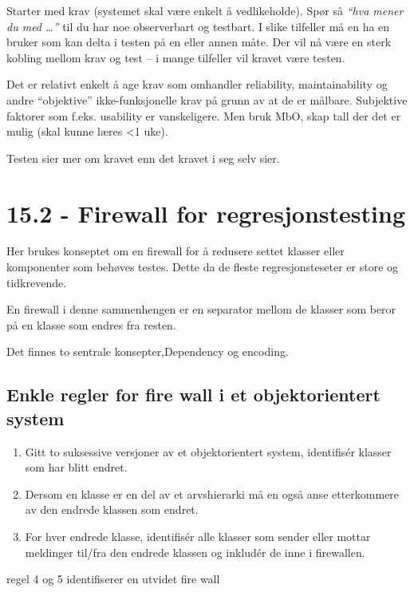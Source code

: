Starter med krav (systemet skal være enkelt å vedlikeholde). Spør så
\emph{``hva mener du med \ldots{}''} til du har noe observerbart og
testbart. I slike tilfeller må en ha en bruker som kan delta i testen på
en eller annen måte. Der vil nå være en sterk kobling mellom krav og
test -- i mange tilfeller vil kravet være testen.

Det er relativt enkelt å age krav som omhandler reliability,
maintainability og andre ``objektive'' ikke-funksjonelle krav på grunn
av at de er målbare. Subjektive faktorer som f.eks. usability er
vanskeligere. Men bruk MbO, skap tall der det er mulig (skal kunne læres
\textless{}1 uke).

Testen sier mer om kravet enn det kravet i seg selv sier.

\section{15.2 - Firewall for regresjonstesting}

Her brukes konseptet om en firewall for å redusere settet klasser eller
komponenter som behøves testes. Dette da de fleste regresjonsteseter er
store og tidkrevende.

En firewall i denne sammenhengen er en separator mellom de klasser som
beror på en klasse som endres fra resten.

Det finnes to sentrale konsepter,Dependency og encoding.

\subsection{Enkle regler for fire wall i et objektorientert system}

\begin{enumerate}[1.]
\item
  Gitt to suksessive versjoner av et objektorientert system, identifisér
  klasser som har blitt endret.
\item
  Dersom en klasse er en del av et arvshierarki må en også anse
  etterkommere av den endrede klassen som endret.
\item
  For hver endrede klasse, identifisér alle klasser som sender eller
  mottar meldinger til/fra den endrede klassen og inkludér de inne i
  firewallen.
\end{enumerate}
regel 4 og 5 identifiserer en utvidet fire wall

